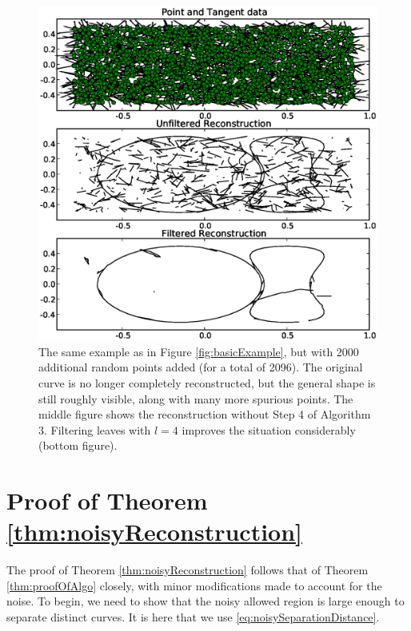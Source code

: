 \documentclass{article}
\numberwithin{cntr}{section}
\numberwithin{equation}{section}
\begin{document}
\begin{figure}
\setlength{\unitlength}{0.240900pt}
\ifx\plotpoint\undefined\newsavebox{\plotpoint}\fi
\sbox{\plotpoint}{\rule[-0.200pt]{0.400pt}{0.400pt}}%
\includegraphics[scale=0.5]{more_noisy_example.eps}
\caption{The same example as in Figure \ref{fig:basicExample}, but with
2000 additional random points added (for a total of 2096).
The original curve is no longer completely reconstructed, but the
general shape is still roughly visible, along with many more spurious
points. The middle figure shows the reconstruction
without Step 4 of Algorithm 3. Filtering leaves with $l=4$ improves
the situation considerably (bottom figure).
\label{fig:moreNoisyExample}}
\end{figure}

\appendix

\section{Proof of Theorem \ref{thm:noisyReconstruction}}
\label{sec:proofOfNoisyReconstruction}
The proof of Theorem \ref{thm:noisyReconstruction} follows that of
Theorem \ref{thm:proofOfAlgo} closely, with minor modifications
made to account for the noise.
To begin, we need to show that the noisy allowed region is large enough
to separate distinct curves. It is here that we use
\eqref{eq:noisySeparationDistance}.
\end{document}
